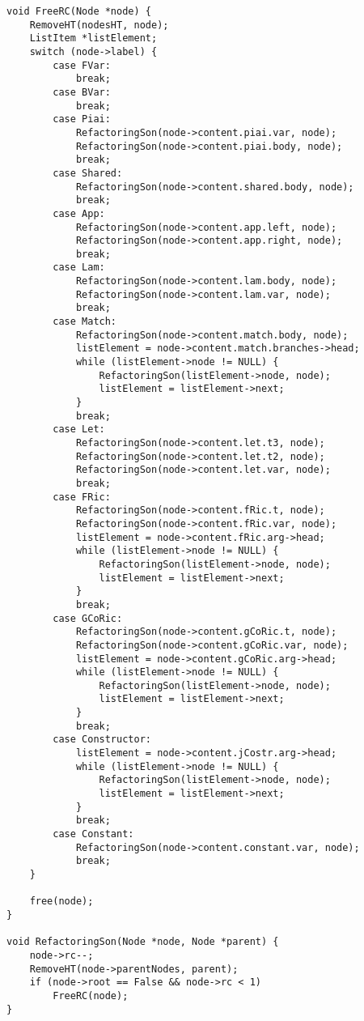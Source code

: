 \documentclass[12pt,a4paper,openright,twoside]{report}
\begin{document}
\begin{verbatim}
void FreeRC(Node *node) {
    RemoveHT(nodesHT, node);
    ListItem *listElement;
    switch (node->label) {
        case FVar:
            break;
        case BVar:
            break;
        case Piai:
            RefactoringSon(node->content.piai.var, node);
            RefactoringSon(node->content.piai.body, node);
            break;
        case Shared:
            RefactoringSon(node->content.shared.body, node);
            break;
        case App:
            RefactoringSon(node->content.app.left, node);
            RefactoringSon(node->content.app.right, node);
            break;
        case Lam:
            RefactoringSon(node->content.lam.body, node);
            RefactoringSon(node->content.lam.var, node);
            break;
        case Match:
            RefactoringSon(node->content.match.body, node);
            listElement = node->content.match.branches->head;
            while (listElement->node != NULL) {
                RefactoringSon(listElement->node, node);
                listElement = listElement->next;
            }
            break;
        case Let:
            RefactoringSon(node->content.let.t3, node);
            RefactoringSon(node->content.let.t2, node);
            RefactoringSon(node->content.let.var, node);
            break;
        case FRic:
            RefactoringSon(node->content.fRic.t, node);
            RefactoringSon(node->content.fRic.var, node);
            listElement = node->content.fRic.arg->head;
            while (listElement->node != NULL) {
                RefactoringSon(listElement->node, node);
                listElement = listElement->next;
            }
            break;
        case GCoRic:
            RefactoringSon(node->content.gCoRic.t, node);
            RefactoringSon(node->content.gCoRic.var, node);
            listElement = node->content.gCoRic.arg->head;
            while (listElement->node != NULL) {
                RefactoringSon(listElement->node, node);
                listElement = listElement->next;
            }
            break;
        case Constructor:
            listElement = node->content.jCostr.arg->head;
            while (listElement->node != NULL) {
                RefactoringSon(listElement->node, node);
                listElement = listElement->next;
            }
            break;
        case Constant:
            RefactoringSon(node->content.constant.var, node);
            break;
    }

    free(node);
}

void RefactoringSon(Node *node, Node *parent) {
    node->rc--;
    RemoveHT(node->parentNodes, parent);
    if (node->root == False && node->rc < 1)
        FreeRC(node);
}
\end{verbatim}
\end{document}
